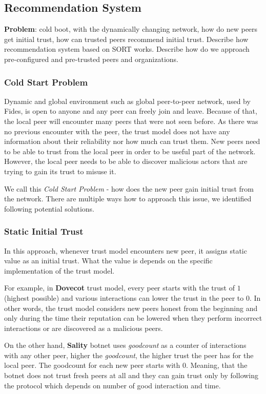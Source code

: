 \subsection{Recommendation System}
\textbf{Problem}: cold boot, with the dynamically changing network, how do new peers get initial trust, how can trusted peers recommend initial trust. Describe how recommendation system based on SORT works. Describe how do we approach pre-configured and pre-trusted peers and organizations.

\subsubsection{Cold Start Problem}
Dynamic and global environment such as global peer-to-peer network, used by Fides, is open to anyone and any peer can freely join and leave. Because of that, the local peer will encounter many peers that were not seen before. As there was no previous encounter with the peer, the trust model does not have any information about their reliability nor how much can trust them. 
New peers need to be able to trust from the local peer in order to be useful part of the network. However, the local peer needs to be able to discover malicious actors that are trying to gain its trust to misuse it. 

We call this \textit{Cold Start Problem} - how does the new peer gain initial trust from the network. There are multiple ways how to approach this issue, we identified following potential solutions.

\subsubsection{Static Initial Trust}
In this approach, whenever trust model encounters new peer, it assigns static value as an initial trust. What the value is depends on the specific implementation of the trust model.

For example, in \textbf{Dovecot} trust model, every peer starts with the trust of $1$ (highest possible) and various interactions can lower the trust in the peer to $0$. In other words, the trust model considers new peers honest from the beginning and only during the time their reputation can be lowered when they perform incorrect interactions or are discovered as a malicious peers.

On the other hand, \textbf{Sality} botnet uses \textit{goodcount} as a counter of interactions with any other peer, higher the \textit{goodcount}, the higher trust the peer has for the local peer. The goodcount for each new peer starts with $0$. Meaning, that the botnet does not trust fresh peers at all and they can gain trust only by following the protocol which depends on number of good interaction and time.

